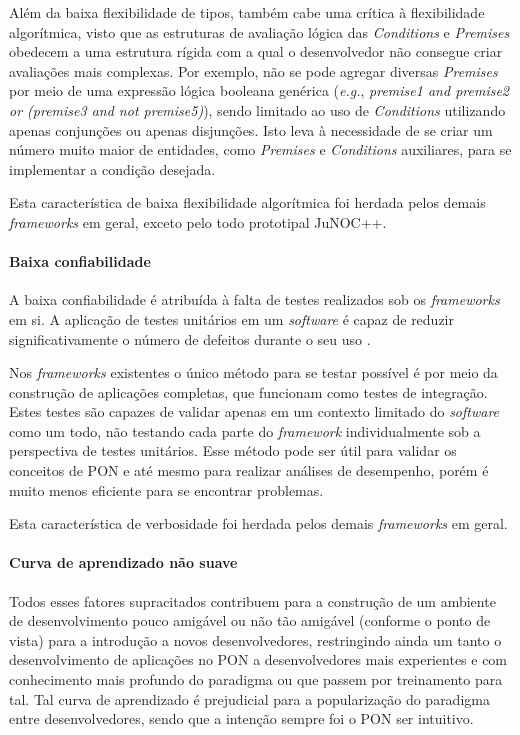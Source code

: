 Além da baixa flexibilidade de tipos, também cabe uma crítica à flexibilidade
algorítmica, visto que as estruturas de avaliação lógica das \textit{Conditions}
e \textit{Premises} obedecem a uma estrutura rígida com a qual o desenvolvedor
não consegue criar avaliações mais complexas. Por exemplo, não se pode agregar
diversas \textit{Premises} por meio de uma expressão lógica booleana genérica
(\textit{e.g.}, \textit{premise1 and premise2 or (premise3 and not premise5)}),
sendo limitado ao uso de \textit{Conditions} utilizando apenas conjunções ou
apenas disjunções. Isto leva à necessidade de se criar um número muito maior de
entidades, como \textit{Premises} e \textit{Conditions} auxiliares, para se
implementar a condição desejada.

Esta característica de baixa flexibilidade algorítmica foi herdada pelos demais
\textit{frameworks} em geral, exceto pelo todo prototipal JuNOC++.

\paragraph*{Baixa confiabilidade}

A baixa confiabilidade é atribuída à falta de testes realizados sob os
\textit{frameworks} em si. A aplicação de testes unitários em um
\textit{software} é capaz de reduzir significativamente o número de defeitos
durante o seu uso \cite{microsoft_test_2009}.

Nos \textit{frameworks} existentes o único método para se testar possível é por
meio da construção de aplicações completas, que funcionam como testes de
integração. Estes testes são capazes de validar apenas em um contexto limitado
do \textit{software} como um todo, não testando cada parte do \textit{framework}
individualmente sob a perspectiva de testes unitários. Esse método pode ser útil
para validar os conceitos de PON e até mesmo para realizar análises de
desempenho, porém é muito menos eficiente para se encontrar problemas.

Esta característica de verbosidade foi herdada pelos demais \textit{frameworks}
em geral.

\paragraph*{Curva de aprendizado não suave}

Todos esses fatores supracitados contribuem para a construção de um ambiente de
desenvolvimento pouco amigável ou não tão amigável (conforme o ponto de vista)
para a introdução a novos desenvolvedores, restringindo ainda um tanto o
desenvolvimento de aplicações no PON a desenvolvedores mais experientes e com
conhecimento mais profundo do paradigma ou que passem por treinamento para tal.
Tal curva de aprendizado é prejudicial para a popularização do paradigma entre
desenvolvedores, sendo que a intenção sempre foi o PON ser intuitivo.

